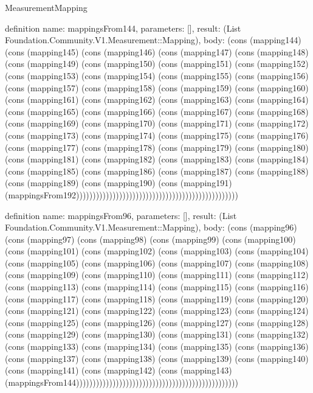 \begin{lexlean}{MeasurementMapping}
\begin{semanticmodule}
definition{
  name: mappingsFrom144,
  parameters: [],
  result: (List Foundation.Community.V1.Measurement::Mapping),
  body: (cons (mapping144) (cons (mapping145) (cons (mapping146) (cons (mapping147) (cons (mapping148) (cons (mapping149) (cons (mapping150) (cons (mapping151) (cons (mapping152) (cons (mapping153) (cons (mapping154) (cons (mapping155) (cons (mapping156) (cons (mapping157) (cons (mapping158) (cons (mapping159) (cons (mapping160) (cons (mapping161) (cons (mapping162) (cons (mapping163) (cons (mapping164) (cons (mapping165) (cons (mapping166) (cons (mapping167) (cons (mapping168) (cons (mapping169) (cons (mapping170) (cons (mapping171) (cons (mapping172) (cons (mapping173) (cons (mapping174) (cons (mapping175) (cons (mapping176) (cons (mapping177) (cons (mapping178) (cons (mapping179) (cons (mapping180) (cons (mapping181) (cons (mapping182) (cons (mapping183) (cons (mapping184) (cons (mapping185) (cons (mapping186) (cons (mapping187) (cons (mapping188) (cons (mapping189) (cons (mapping190) (cons (mapping191) (mappingsFrom192)))))))))))))))))))))))))))))))))))))))))))))))))
}

definition{
  name: mappingsFrom96,
  parameters: [],
  result: (List Foundation.Community.V1.Measurement::Mapping),
  body: (cons (mapping96) (cons (mapping97) (cons (mapping98) (cons (mapping99) (cons (mapping100) (cons (mapping101) (cons (mapping102) (cons (mapping103) (cons (mapping104) (cons (mapping105) (cons (mapping106) (cons (mapping107) (cons (mapping108) (cons (mapping109) (cons (mapping110) (cons (mapping111) (cons (mapping112) (cons (mapping113) (cons (mapping114) (cons (mapping115) (cons (mapping116) (cons (mapping117) (cons (mapping118) (cons (mapping119) (cons (mapping120) (cons (mapping121) (cons (mapping122) (cons (mapping123) (cons (mapping124) (cons (mapping125) (cons (mapping126) (cons (mapping127) (cons (mapping128) (cons (mapping129) (cons (mapping130) (cons (mapping131) (cons (mapping132) (cons (mapping133) (cons (mapping134) (cons (mapping135) (cons (mapping136) (cons (mapping137) (cons (mapping138) (cons (mapping139) (cons (mapping140) (cons (mapping141) (cons (mapping142) (cons (mapping143) (mappingsFrom144)))))))))))))))))))))))))))))))))))))))))))))))))
}


\end{semanticmodule}
\end{lexlean}
